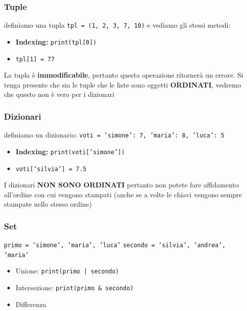 \documentclass{beamer}
\begin{document}
\begin{frame}
    
    \frametitle{Tuple}
    definiamo una tupla
    \texttt{tpl = (1, 2, 3, 7, 10)}
    e vediamo gli stessi metodi:
    \begin{itemize}
        \item \textbf{Indexing:} \texttt{print(tpl[0])}
        \item \texttt{tpl[1] = 77}
    \end{itemize}

    La tupla è \textbf{immodificabile}, pertanto questa operazione ritornerà un errore.
    Si tenga presente che sia le tuple che le liste sono oggetti \textbf{ORDINATI}, vedremo che questo non è vero per i dizionari

\end{frame}

\begin{frame}
    
    \frametitle{Dizionari}
    definiamo un dizionario:
    \texttt{voti = {'simone': 7, 'maria': 8, 'luca': 5}}
    
    \begin{itemize}
        \item \textbf{Indexing:} \texttt{print(voti['simone'])}
        \item \texttt{voti['silvia'] = 7.5}
    \end{itemize}

    I dizionari \textbf{NON SONO ORDINATI} pertanto non potete fare affidamento all'ordine con cui vengono stampati (anche se a volte le chiavi vengono sempre stampate nello stesso ordine)

\end{frame}

\begin{frame}
    
    \frametitle{Set}

    \texttt{primo = {'simone', 'maria', 'luca'}}
    \texttt{secondo = {'silvia', 'andrea', 'maria'}}
    
    \begin{itemize}
        \item Unione: \texttt{print(primo | secondo)}
        \item Intersezione: \texttt{print(primo & secondo)}
        \item Differenza 
    \end{itemize}

\end{frame}
\end{document}
